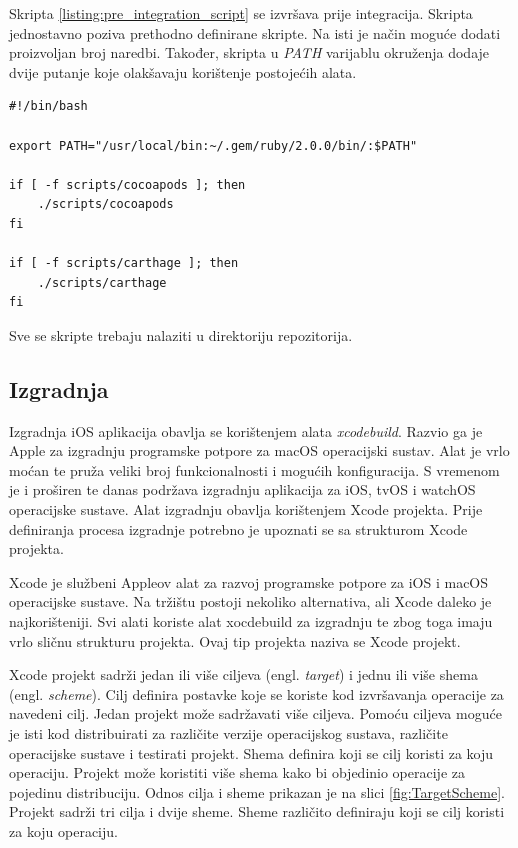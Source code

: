 \documentclass[times, utf8, diplomski, numeric]{fer}
\newcommand{\eng}[1]{(engl. \textit{#1})}
\begin{document}
Skripta \ref{listing:pre_integration_script} se izvršava prije integracija. Skripta jednostavno poziva prethodno definirane skripte. Na isti je način moguće dodati proizvoljan broj naredbi. Također, skripta u \textit{PATH} varijablu okruženja dodaje dvije putanje koje olakšavaju korištenje postojećih alata.

\begin{lstlisting}[caption=Skripta koja se izvršava prije integracije, label=listing:pre_integration_script]
#!/bin/bash

export PATH="/usr/local/bin:~/.gem/ruby/2.0.0/bin/:$PATH"

if [ -f scripts/cocoapods ]; then
    ./scripts/cocoapods
fi

if [ -f scripts/carthage ]; then
    ./scripts/carthage
fi
\end{lstlisting}

Sve se skripte trebaju nalaziti u  direktoriju repozitorija.

\subsection{Izgradnja}

Izgradnja iOS aplikacija obavlja se korištenjem alata \textit{xcodebuild}\citep{xcodebuild}. Razvio ga je Apple za izgradnju programske potpore za macOS operacijski sustav. Alat je vrlo moćan te pruža veliki broj funkcionalnosti i mogućih konfiguracija. S vremenom je i proširen te danas podržava izgradnju aplikacija za iOS, tvOS i watchOS operacijske sustave. Alat izgradnju obavlja korištenjem Xcode projekta. Prije definiranja procesa izgradnje potrebno je upoznati se sa strukturom Xcode projekta.

Xcode je službeni Appleov alat za razvoj programske potpore za iOS i macOS operacijske sustave. Na tržištu postoji nekoliko alternativa, ali Xcode daleko je najkorišteniji. Svi alati koriste alat xocdebuild za izgradnju te zbog toga imaju vrlo sličnu strukturu projekta. Ovaj tip projekta naziva se Xcode projekt.

Xcode projekt sadrži jedan ili više ciljeva \eng{target} i jednu ili više shema \eng{scheme}. Cilj definira postavke koje se koriste kod izvršavanja operacije za navedeni cilj. Jedan projekt može sadržavati više ciljeva. Pomoću ciljeva moguće je isti kod distribuirati za različite verzije operacijskog sustava, različite operacijske sustave i testirati projekt. Shema definira koji se cilj koristi za koju operaciju. Projekt može koristiti više shema kako bi objedinio operacije za pojedinu distribuciju. Odnos cilja i sheme prikazan je na slici \ref{fig:TargetScheme}. Projekt sadrži tri cilja i dvije sheme. Sheme različito definiraju koji se cilj koristi za koju operaciju.
\end{document}
